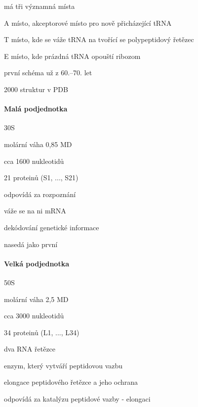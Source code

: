 \documentclass[DIV=8]{scrreprt}
\begin{document}
\begin{myItemize}[nosep]
    \item má tři významná místa
\begin{myItemize}[nosep]
    \item A místo, akceptorové místo pro nově přicházející tRNA
    \item T místo, kde se váže tRNA na tvořící se polypeptidový řetězec
    \item E místo, kde prázdná tRNA opouští ribozom
\end{myItemize}

    \item první schéma už z 60.--70. let
    \item 2000 struktur v PDB
\end{myItemize}



\paragraph{Malá podjednotka}
\begin{myItemize}[nosep]
    \item 30S
    \item molární váha 0,85 MD
    \item cca 1600 nukleotidů
    \item 21 proteinů (S1, ..., S21)
    \item odpovídá za rozpoznání
    \item váže se na ni mRNA
    \item dekódování genetické informace
    \item nasedá jako první
\end{myItemize}



\paragraph{Velká podjednotka}
\begin{myItemize}[nosep]
    \item 50S
    \item molární váha 2,5 MD
    \item cca 3000 nukleotidů
    \item 34 proteinů (L1, ..., L34)
    \item dva RNA řetězce
    \item enzym, který vytváří peptidovou vazbu
    \item elongace peptidového řetězce a jeho ochrana
    \item odpovídá za katalýzu peptidové vazby - elongaci
\end{myItemize}
\end{document}
